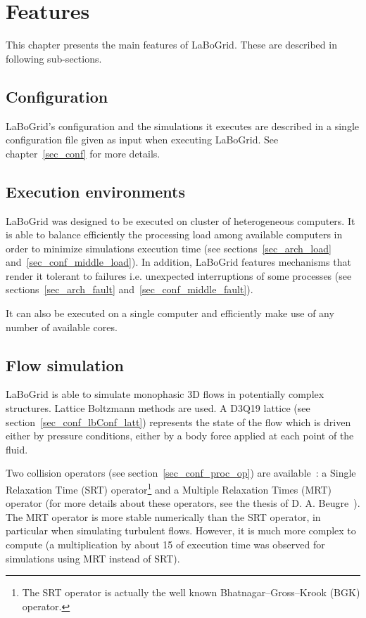 \chapter{Features}
\label{sec_feat}

This chapter presents the main features of LaBoGrid. These are described in
following sub-sections.


\section{Configuration}

LaBoGrid's configuration and the simulations it executes are described in a
single configuration file given as input when executing LaBoGrid. See
chapter~\ref{sec_conf} for more details.


\section{Execution environments}

LaBoGrid was designed to be executed on cluster of heterogeneous computers. It
is able to balance efficiently the processing load among available computers in
order to minimize simulations execution time (see sections~\ref{sec_arch_load}
and~\ref{sec_conf_middle_load}). In addition, LaBoGrid features mechanisms that
render it tolerant to failures i.e. unexpected interruptions of some processes
(see sections~\ref{sec_arch_fault} and~\ref{sec_conf_middle_fault}).

It can also be executed on a single computer and efficiently make use of any
number of available cores.


\section{Flow simulation}

LaBoGrid is able to simulate monophasic 3D flows in potentially complex
structures. Lattice Boltzmann methods are used. A D3Q19 lattice (see
section~\ref{sec_conf_lbConf_latt}) represents the state of the flow which is
driven either by pressure conditions, either by a body force applied at each
point of the fluid.

Two collision operators (see section~\ref{sec_conf_proc_op})
are available~: a Single Relaxation Time (SRT) operator\footnote{The SRT
operator is actually the well known Bhatnagar--Gross--Krook (BGK) operator.}
and a Multiple Relaxation Times (MRT) operator (for more details about these
operators, see the thesis of D. A. Beugre~\cite{Beugre10}). The MRT operator is
more stable numerically than the SRT operator, in particular when simulating
turbulent flows. However, it is much more complex to compute (a multiplication
by about 15 of execution time was observed for simulations using MRT instead of
SRT).

